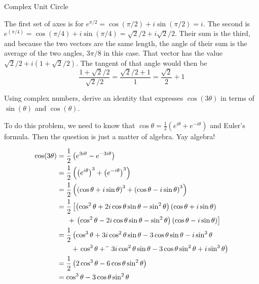 \documentclass[11pt,answers]{exam}
\begin{document}
\begin{questions}
\begin{solution}
\end{solution}

\question Complex Unit Circle
\begin{solution}


The first set of axes is for $e^{\pi/2} = \cos(\pi/2) + i\sin(\pi/2) = i$.  The second is $e^(\pi/4) = \cos(\pi/4) + i\sin(\pi/4) = \sqrt{2}/2 + i\sqrt{2}/2$.  Their sum is the third, and because the two vectors are the same length, the angle of their sum is the average of the two angles, $3\pi/8$ in this case.  That vector has the value $\sqrt{2}/2 + i(1 + \sqrt{2}/2)$.  The tangent of that angle would then be 
\[
\frac{1 + \sqrt{2}/2}{\sqrt{2}/2} = \frac{\sqrt{2}/2 + 1}{1} = \frac{\sqrt{2}}{2} + 1
\]

\end{solution}

\question Using complex numbers, derive an identity that expresses $\cos(3\theta)$ in terms of $\sin(\theta)$ and $\cos(\theta)$.
\begin{solution}

To do this problem, we need to know that $\cos{\theta} = \frac{1}{2}\left(e^{i\theta} + e^{-i\theta} \right)$ and Euler's formula.  Then the question is just a matter of algebra.  Yay algebra!

\begin{align*}
\cos(3\theta) &= \frac{1}{2}\left( e^{3i\theta} - e^{-3i\theta} \right) \\
&= \frac{1}{2}\left( \left( e^{i\theta} \right)^3 + \left( e^{-i\theta} \right)^3 \right) \\
&= \frac{1}{2}\left( \left( \cos{\theta} + i\sin{\theta} \right)^3 + \left( \cos{\theta} - i\sin{\theta} \right)^3 \right)\\
&= \frac{1}{2} \left[ \left(\cos^2\theta + 2i \cos{\theta}\sin{\theta} - \sin^2\theta \right) \left(\cos{\theta} + i\sin{\theta}\right) \right. \\
&\hbox{\hspace{1.5em}}+ \left. \left( \cos^2\theta - 2i\cos{\theta}\sin{\theta} - \sin^2\theta \right)\left( \cos{\theta} - i\sin{\theta} \right) \right] \\
&= \frac{1}{2}\left( \cos^3\theta + 3i \cos^2\theta\sin{\theta} - 3\cos{\theta}\sin{\theta} - i\sin^3\theta \right.\\
&\hbox{\hspace{2em}}+ \left. \cos^3\theta + ^-3i\cos^2\theta\sin{\theta} - 3 \cos{\theta}\sin^2\theta + i\sin^3\theta \right) \\
&= \frac{1}{2}\left( 2\cos^3\theta - 6\cos\theta\sin^2\theta \right)\\
&= \cos^3\theta - 3\cos{\theta}\sin^2\theta
\end{align*}
\end{solution}


\end{questions}
\end{document}
